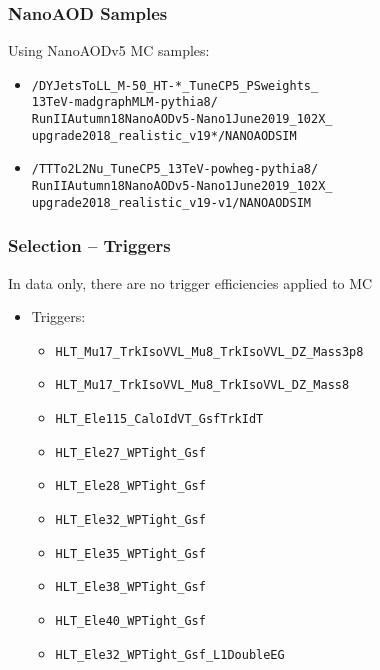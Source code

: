 \documentclass{beamer}
\begin{document}
\begin{frame}
  \frametitle{NanoAOD Samples}

  Using NanoAODv5 MC samples:

  \begin{itemize}
  \item \texttt{\small /DYJetsToLL\_M-50\_HT-*\_TuneCP5\_PSweights\_\\13TeV-madgraphMLM-pythia8/\\RunIIAutumn18NanoAODv5-Nano1June2019\_102X\_\\upgrade2018\_realistic\_v19*/NANOAODSIM}
  \item \texttt{\small /TTTo2L2Nu\_TuneCP5\_13TeV-powheg-pythia8/\\RunIIAutumn18NanoAODv5-Nano1June2019\_102X\_\\upgrade2018\_realistic\_v19-v1/NANOAODSIM}
  \end{itemize}

\end{frame}

\begin{frame}
  \frametitle{Selection -- Triggers}

  In data only, there are no trigger efficiencies applied to MC

  \begin{itemize}
  \item Triggers:
    \begin{itemize}
    \item \texttt{HLT\_Mu17\_TrkIsoVVL\_Mu8\_TrkIsoVVL\_DZ\_Mass3p8}
    \item \texttt{HLT\_Mu17\_TrkIsoVVL\_Mu8\_TrkIsoVVL\_DZ\_Mass8}
    \item \texttt{HLT\_Ele115\_CaloIdVT\_GsfTrkIdT}
    \item \texttt{HLT\_Ele27\_WPTight\_Gsf}
    \item \texttt{HLT\_Ele28\_WPTight\_Gsf}
    \item \texttt{HLT\_Ele32\_WPTight\_Gsf}
    \item \texttt{HLT\_Ele35\_WPTight\_Gsf}
    \item \texttt{HLT\_Ele38\_WPTight\_Gsf}
    \item \texttt{HLT\_Ele40\_WPTight\_Gsf}
    \item \texttt{HLT\_Ele32\_WPTight\_Gsf\_L1DoubleEG}
    \end{itemize}
  \end{itemize}

\end{frame}
\end{document}
